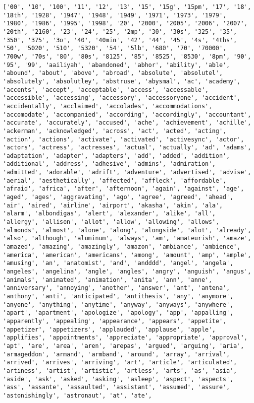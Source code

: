 \documentclass[11pt]{article}
\begin{document}
    \begin{Verbatim}[commandchars=\\\{\}]
['00', '10', '100', '11', '12', '13', '15', '15g', '15pm', '17', '18', '18th', '1928', '1947', '1948', '1949', '1971', '1973', '1979', '1980', '1986', '1995', '1998', '20', '2000', '2005', '2006', '2007', '20th', '2160', '23', '24', '25', '2mp', '30', '30s', '325', '35', '350', '375', '3o', '40', '40min', '42', '44', '45', '4s', '4ths', '50', '5020', '510', '5320', '54', '5lb', '680', '70', '70000', '700w', '70s', '80', '80s', '8125', '85', '8525', '8530', '8pm', '90', '95', '99', 'aailiyah', 'abandoned', 'abhor', 'ability', 'able', 'abound', 'about', 'above', 'abroad', 'absolute', 'absolutel', 'absolutely', 'absolutley', 'abstruse', 'abysmal', 'ac', 'academy', 'accents', 'accept', 'acceptable', 'access', 'accessable', 'accessible', 'accessing', 'accessory', 'accessoryone', 'accident', 'accidentally', 'acclaimed', 'accolades', 'accommodations', 'accomodate', 'accompanied', 'according', 'accordingly', 'accountant', 'accurate', 'accurately', 'accused', 'ache', 'achievement', 'achille', 'ackerman', 'acknowledged', 'across', 'act', 'acted', 'acting', 'action', 'actions', 'activate', 'activated', 'activesync', 'actor', 'actors', 'actress', 'actresses', 'actual', 'actually', 'ad', 'adams', 'adaptation', 'adapter', 'adapters', 'add', 'added', 'addition', 'additional', 'address', 'adhesive', 'admins', 'admiration', 'admitted', 'adorable', 'adrift', 'adventure', 'advertised', 'advise', 'aerial', 'aesthetically', 'affected', 'affleck', 'affordable', 'afraid', 'africa', 'after', 'afternoon', 'again', 'against', 'age', 'aged', 'ages', 'aggravating', 'ago', 'agree', 'agreed', 'ahead', 'air', 'aired', 'airline', 'airport', 'akasha', 'akin', 'ala', 'alarm', 'albondigas', 'alert', 'alexander', 'alike', 'all', 'allergy', 'allison', 'allot', 'allow', 'allowing', 'allows', 'almonds', 'almost', 'alone', 'along', 'alongside', 'alot', 'already', 'also', 'although', 'aluminum', 'always', 'am', 'amateurish', 'amaze', 'amazed', 'amazing', 'amazingly', 'amazon', 'ambiance', 'ambience', 'america', 'american', 'americans', 'among', 'amount', 'amp', 'ample', 'amusing', 'an', 'anatomist', 'and', 'andddd', 'angel', 'angela', 'angeles', 'angelina', 'angle', 'angles', 'angry', 'anguish', 'angus', 'animals', 'animated', 'animation', 'anita', 'ann', 'anne', 'anniversary', 'annoying', 'another', 'answer', 'ant', 'antena', 'anthony', 'anti', 'anticipated', 'antithesis', 'any', 'anymore', 'anyone', 'anything', 'anytime', 'anyway', 'anyways', 'anywhere', 'apart', 'apartment', 'apologize', 'apology', 'app', 'appalling', 'apparently', 'appealing', 'appearance', 'appears', 'appetite', 'appetizer', 'appetizers', 'applauded', 'applause', 'apple', 'applifies', 'appointments', 'appreciate', 'appropriate', 'approval', 'apt', 'are', 'area', 'aren', 'arepas', 'argued', 'arguing', 'aria', 'armageddon', 'armand', 'armband', 'around', 'array', 'arrival', 'arrived', 'arrives', 'arriving', 'art', 'article', 'articulated', 'artiness', 'artist', 'artistic', 'artless', 'arts', 'as', 'asia', 'aside', 'ask', 'asked', 'asking', 'asleep', 'aspect', 'aspects', 'ass', 'assante', 'assaulted', 'assistant', 'assumed', 'assure', 'astonishingly', 'astronaut', 'at', 'ate', 
\end{Verbatim}
\end{document}
